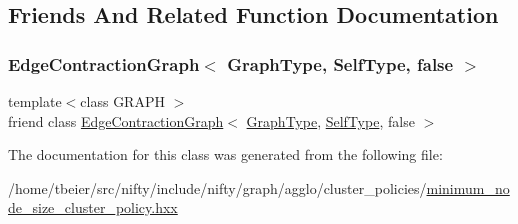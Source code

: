 \subsection{Friends And Related Function Documentation}
\mbox{\label{classnifty_1_1graph_1_1agglo_1_1MinimumNodeSizeClusterPolicy_aca0e7e94ea239b3e26ea0173e356de7a}} 
\subsubsection{\texorpdfstring{Edge\+Contraction\+Graph$<$ Graph\+Type, Self\+Type, false $>$}{EdgeContractionGraph< GraphType, SelfType, false >}}
{\footnotesize\ttfamily template$<$class G\+R\+A\+PH $>$ \\
friend class \hyperlink{classnifty_1_1graph_1_1EdgeContractionGraph}{Edge\+Contraction\+Graph}$<$ \hyperlink{classnifty_1_1graph_1_1agglo_1_1MinimumNodeSizeClusterPolicy_a6d81a64ca67c9feec052a031552282f0}{Graph\+Type}, \hyperlink{classnifty_1_1graph_1_1agglo_1_1MinimumNodeSizeClusterPolicy}{Self\+Type}, false $>$\hspace{0.3cm}{\ttfamily [friend]}}



The documentation for this class was generated from the following file\+:\begin{DoxyCompactItemize}
\item 
/home/tbeier/src/nifty/include/nifty/graph/agglo/cluster\+\_\+policies/\hyperlink{minimum__node__size__cluster__policy_8hxx}{minimum\+\_\+node\+\_\+size\+\_\+cluster\+\_\+policy.\+hxx}\end{DoxyCompactItemize}
